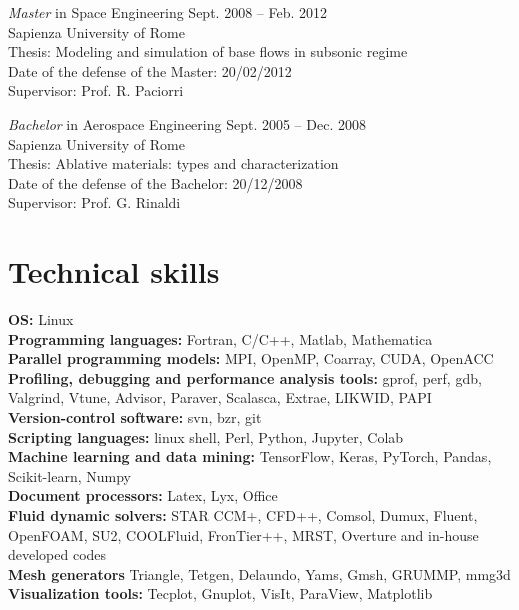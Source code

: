 \documentclass[11pt]{res} %
\begin{document}
\begin{resume}
{\sl Master} in Space Engineering  \hfill Sept. 2008 -- Feb. 2012 \\ 
Sapienza University of Rome\\
Thesis: Modeling and simulation of base flows in subsonic regime \\
Date of the defense of the Master: 20/02/2012 \\
Supervisor: Prof. R. Paciorri 

{\sl Bachelor} in Aerospace Engineering \hfill Sept. 2005 -- Dec. 2008 \\ 
Sapienza University of Rome\\
Thesis: Ablative materials: types and characterization \\
Date of the defense of the Bachelor: 20/12/2008 \\
Supervisor: Prof. G. Rinaldi


\section{{Technical skills}}
\textbf{OS:} Linux \\
\textbf{Programming languages:} Fortran, C/C++, Matlab, Mathematica \\
\textbf{Parallel programming models:} MPI, OpenMP, Coarray, CUDA, OpenACC \\
\textbf{Profiling, debugging and performance analysis tools:} gprof, perf, gdb, Valgrind, Vtune, Advisor, Paraver, Scalasca, Extrae, LIKWID, PAPI \\
\textbf{Version-control software:} svn, bzr, git \\
\textbf{Scripting languages:} linux shell, Perl, Python, Jupyter, Colab \\
\textbf{Machine learning and data mining:} TensorFlow, Keras, PyTorch, Pandas, Scikit-learn, Numpy \\
\textbf{Document processors:} Latex, Lyx, Office \\
\textbf{Fluid dynamic solvers:} STAR CCM+, CFD++, Comsol, Dumux, Fluent, OpenFOAM, SU2, COOLFluid, FronTier++, MRST, Overture and in-house developed codes \\
\textbf{Mesh generators} Triangle, Tetgen, Delaundo, Yams, Gmsh, GRUMMP, mmg3d \\
\textbf{Visualization tools:} Tecplot, Gnuplot, VisIt, ParaView, Matplotlib


\end{resume}
\end{document}
